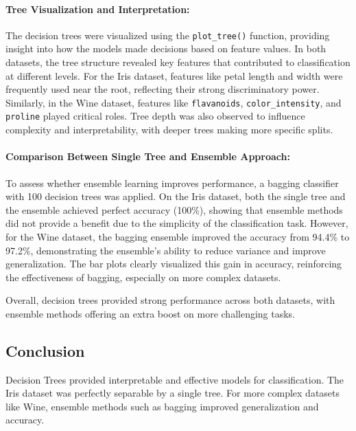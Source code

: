 \documentclass[a4paper,12pt]{article}
\begin{document}
\paragraph{Tree Visualization and Interpretation:}
The decision trees were visualized using the \texttt{plot\_tree()} function, providing insight into how the models made decisions based on feature values. In both datasets, the tree structure revealed key features that contributed to classification at different levels. For the Iris dataset, features like petal length and width were frequently used near the root, reflecting their strong discriminatory power. Similarly, in the Wine dataset, features like \texttt{flavanoids}, \texttt{color\_intensity}, and \texttt{proline} played critical roles. Tree depth was also observed to influence complexity and interpretability, with deeper trees making more specific splits.

\paragraph{Comparison Between Single Tree and Ensemble Approach:}
To assess whether ensemble learning improves performance, a bagging classifier with 100 decision trees was applied. On the Iris dataset, both the single tree and the ensemble achieved perfect accuracy (100\%), showing that ensemble methods did not provide a benefit due to the simplicity of the classification task. However, for the Wine dataset, the bagging ensemble improved the accuracy from 94.4\% to 97.2\%, demonstrating the ensemble’s ability to reduce variance and improve generalization. The bar plots clearly visualized this gain in accuracy, reinforcing the effectiveness of bagging, especially on more complex datasets.

Overall, decision trees provided strong performance across both datasets, with ensemble methods offering an extra boost on more challenging tasks.


\subsection{Conclusion}
Decision Trees provided interpretable and effective models for classification. The Iris dataset was perfectly separable by a single tree. For more complex datasets like Wine, ensemble methods such as bagging improved generalization and accuracy.
\end{document}
